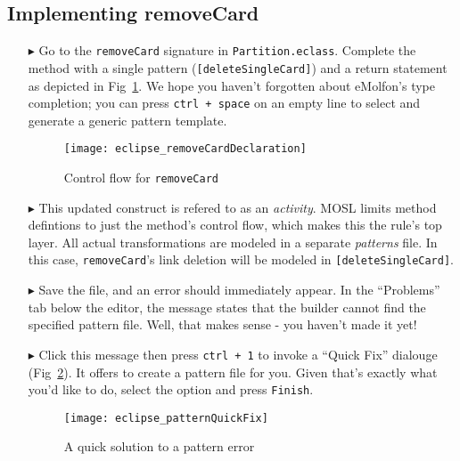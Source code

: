 \newpage
\hypertarget{remCard tex}{}
\subsection{Implementing removeCard}
\texHeader

\begin{itemize}

\item[$\blacktriangleright$] Go to the \texttt{removeCard} signature in \texttt{Partition.eclass}. Complete the method with a single pattern
(\texttt{[deleteSingleCard]}) and a return statement as depicted in Fig~\ref{fig:remCardDec}. We hope you haven't forgotten about eMolfon's type completion; you
can press \texttt{ctrl + space} on an empty line to select and generate a generic pattern template.


\begin{figure}[htp]
\begin{center}
  \texttt{[image: eclipse\_removeCardDeclaration]}
  \caption{Control flow for \texttt{removeCard}}
  \label{fig:remCardDec}
\end{center}
\end{figure}

\item[$\blacktriangleright$] This updated construct is refered to as an \emph{activity}. MOSL limits method defintions to just the method's control flow, which
makes this the rule's top layer. All actual transformations are modeled in a separate \emph{patterns} file. In this case, \texttt{removeCard}'s link
deletion will be modeled in \texttt{[deleteSingleCard]}.

\item[$\blacktriangleright$] Save the file, and an error should immediately appear. In the ``Problems'' tab below the editor, the message states that
the builder cannot find the specified pattern file. Well, that makes sense - you haven't made it yet! 

\item[$\blacktriangleright$] Click this message then press \texttt{ctrl + 1} to invoke a ``Quick Fix'' dialouge (Fig~\ref{fig:quixFix}). It offers to create a
pattern file for you. Given that's exactly what you'd like to do, select the option and press \texttt{Finish}.

\begin{figure}[htp]
\begin{center}
  \texttt{[image: eclipse\_patternQuickFix]}
  \caption{A quick solution to a pattern error}
  \label{fig:quixFix}
\end{center}
\end{figure}


\end{itemize}
